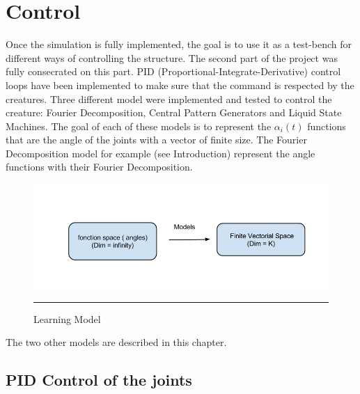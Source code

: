 
\chapter{Control} %

\label{Chapter 3} %


%
Once the simulation is fully implemented, the goal is to use it as a test-bench for different ways of controlling the structure. The second part of the project was fully consecrated on this part. PID (Proportional-Integrate-Derivative) control loops have been implemented to make sure that the command is respected by the creatures. Three different model were implemented and tested to control the creature: Fourier Decomposition, Central Pattern Generators and Liquid State Machines. The goal of each of these models is to represent the $\alpha_i(t)$ functions that are the angle of the joints with a vector of finite size. The Fourier Decomposition model for example (see Introduction) represent the angle functions with their Fourier Decomposition.

\begin{figure}[htbp]
    \centering
    \includegraphics[scale=0.5]{Figures/models.png}
    \rule{35em}{0.5pt}
    \caption[Learning Model]{Learning Model}
    \label{fig:models}
\end{figure}

The two other models are described in this chapter.

\section{PID Control of the joints}

